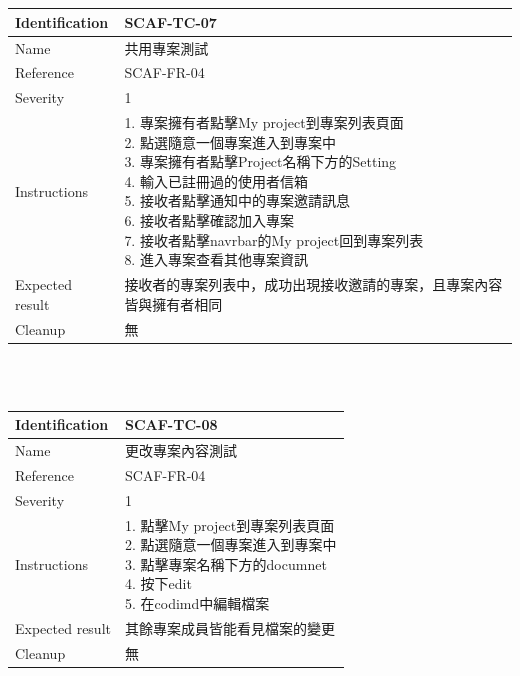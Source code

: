 \documentclass{report}
\begin{document}
\\
\newline
\\
\begin{tabularx}{\textwidth}{
  |p{}%
  |p{}|%
  }
  \hline
  \centering Identification &  SCAF-TC-07 \\
  \hline
  \centering Name & 共用專案測試 \\
  \hline
  \centering Reference & SCAF-FR-04 \\
  \hline
  \centering Severity & 1 \\
  \hline
  \centering Instructions & 
  \makecell[l]{
    1. 專案擁有者點擊My project到專案列表頁面 \\
    2. 點選隨意一個專案進入到專案中 \\
    3. 專案擁有者點擊Project名稱下方的Setting \\
    4. 輸入已註冊過的使用者信箱 \\
    5. 接收者點擊通知中的專案邀請訊息 \\
    6. 接收者點擊確認加入專案 \\
    7. 接收者點擊navrbar的My project回到專案列表 \\
    8. 進入專案查看其他專案資訊
  }\\
  \hline
  \centering Expected result & 接收者的專案列表中，成功出現接收邀請的專案，且專案內容皆與擁有者相同 \\
  \hline
  \centering Cleanup & 無 \\
  \hline
\end{tabularx}
\\
\newline
\\
\begin{tabularx}{\textwidth}{
  |p{}%
  |p{}|%
  }
  \hline
  \centering Identification &  SCAF-TC-08 \\
  \hline
  \centering Name & 更改專案內容測試 \\
  \hline
  \centering Reference & SCAF-FR-04 \\
  \hline
  \centering Severity & 1 \\
  \hline
  \centering Instructions & 
  \makecell[l]{
    1. 點擊My project到專案列表頁面 \\
    2. 點選隨意一個專案進入到專案中 \\
    3. 點擊專案名稱下方的documnet \\
    4. 按下edit \\
    5. 在codimd中編輯檔案
  }\\
  \hline
  \centering Expected result & 其餘專案成員皆能看見檔案的變更 \\
  \hline
  \centering Cleanup & 無 \\
  \hline
\end{tabularx}
\end{document}
